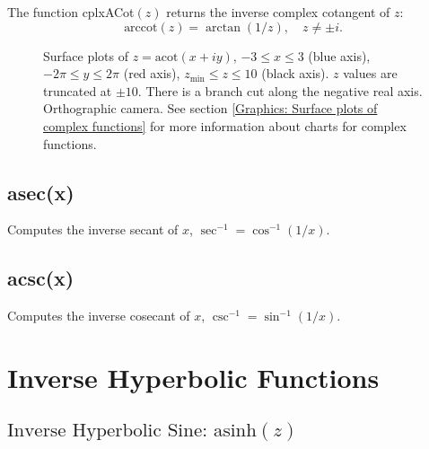 \vspace{0.3cm}
The function \textsf{cplxACot$(z)$} returns the inverse complex cotangent of $z$: 
\begin{equation}
	\text{arccot}(z) = \arctan(1/z), \quad z \neq \pm i.
\end{equation}



\begin{figure}[ht]%
	\centering
	\qquad
	\caption[Complex Arccotangent]{Surface plots of $z = \text{acot}(x + iy)$, $-3 \leq x \leq 3$ (blue axis), $-2 \pi \leq y \leq 2\pi$ (red axis), $z_{\text{min}} \leq z \leq 10$ (black axis). $z$ values are truncated at $\pm 10$. There is a branch cut along the negative real axis. Orthographic camera. See section \ref{Graphics: Surface plots of complex functions} for more information about charts for complex functions.} 
	\label{fig:Complex Arccotangent}%
\end{figure}



\subsection{asec(x)}
Computes the inverse secant of $x$, $\sec^{-1} = \cos^{-1}(1/x)$.


\subsection{acsc(x)}
Computes the inverse cosecant of $x$, $\csc^{-1} = \sin^{-1}(1/x)$.


\newpage
\section{Inverse Hyperbolic Functions}
\label{InversehyperbolicFunctionsCplx}


\subsection{\texorpdfstring{$\text{Inverse Hyperbolic Sine: asinh}(z)$}{asinh}}
\label{inverse complex hyperbolic sine}

